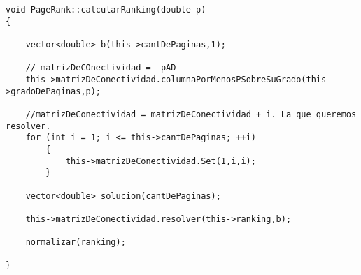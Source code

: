 \begin{lstlisting}
void PageRank::calcularRanking(double p)
{

    vector<double> b(this->cantDePaginas,1);

    // matrizDeCOnectividad = -pAD
    this->matrizDeConectividad.columnaPorMenosPSobreSuGrado(this->gradoDePaginas,p);

    //matrizDeConectividad = matrizDeConectividad + i. La que queremos resolver.
    for (int i = 1; i <= this->cantDePaginas; ++i)
        {
            this->matrizDeConectividad.Set(1,i,i);
        }    

    vector<double> solucion(cantDePaginas);

    this->matrizDeConectividad.resolver(this->ranking,b);

    normalizar(ranking);

}

\end{lstlisting}

\newpage